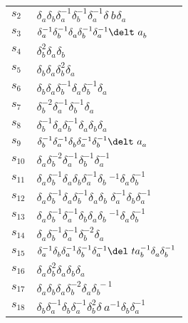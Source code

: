 \documentclass{article}
\begin{document}
\begin{center}
\begin{tabular}{ll}
$s_{2}$ & $\delta_a^{}\delta_b^{}\delta_a^{-1}\delta_b^{-1}\delta_a^{-1}\delta_\
b^{}\delta_a^{}$ \\
$s_{3}$ & $\delta_a^{-1}\delta_b^{-1}\delta_a^{}\delta_b^{-1}\delta_a^{-1}\delt\
a_b^{}$ \\
$s_{4}$ & $\delta_b^{2}\delta_a^{}\delta_b^{}$ \\
$s_{5}$ & $\delta_b^{}\delta_a^{}\delta_b^{2}\delta_a^{}$ \\
$s_{6}$ & $\delta_b^{}\delta_a^{}\delta_b^{-1}\delta_a^{}\delta_b^{-1}\delta_a^\
{}$ \\
$s_{7}$ & $\delta_b^{-2}\delta_a^{-1}\delta_b^{-1}\delta_a^{}$ \\
$s_{8}$ & $\delta_b^{-1}\delta_a^{}\delta_b^{-1}\delta_a^{}\delta_b^{}\delta_a^\
{}$ \\
$s_{9}$ & $\delta_b^{-1}\delta_a^{-1}\delta_b^{}\delta_a^{-1}\delta_b^{-1}\delt\
a_a^{}$ \\
$s_{10}$ & $\delta_a^{}\delta_b^{-2}\delta_a^{-1}\delta_b^{-1}\delta_a^{-1}$ \\
$s_{11}$ & $\delta_a^{}\delta_b^{-1}\delta_a^{}\delta_b^{}\delta_a^{-1}\delta_b\
^{-1}\delta_a^{}\delta_b^{-1}$ \\
$s_{12}$ & $\delta_a^{}\delta_b^{-1}\delta_a^{}\delta_b^{-1}\delta_a^{}\delta_b\
^{}\delta_a^{-1}\delta_b^{}\delta_a^{-1}$ \\
$s_{13}$ & $\delta_a^{}\delta_b^{-1}\delta_a^{-1}\delta_b^{}\delta_a^{}\delta_b\
^{-1}\delta_a^{}\delta_b^{-1}$ \\
$s_{14}$ & $\delta_a^{}\delta_b^{-1}\delta_a^{-1}\delta_b^{-2}\delta_a^{}$ \\
$s_{15}$ & $\delta_a^{-1}\delta_b^{}\delta_a^{-1}\delta_b^{-1}\delta_a^{-1}\del\
ta_b^{-1}\delta_a^{}\delta_b^{-1}$ \\
$s_{16}$ & $\delta_a^{}\delta_b^{2}\delta_a^{}\delta_b^{}\delta_a^{}$ \\
$s_{17}$ & $\delta_a^{}\delta_b^{}\delta_a^{}\delta_b^{-2}\delta_a^{}\delta_b^{\
-1}$ \\
$s_{18}$ & $\delta_b^{}\delta_a^{-1}\delta_b^{}\delta_a^{-1}\delta_b^{2}\delta_\
a^{-1}\delta_b^{}\delta_a^{-1}$ \\
\bottomrule
\end{tabular}
\end{center}

\thispagestyle{empty}
\end{document}
